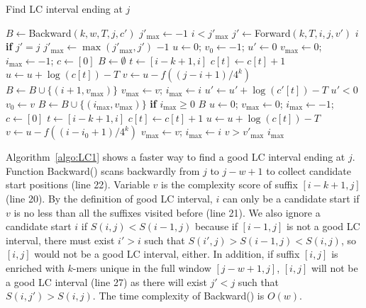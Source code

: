 \documentclass[webpdf,contemporary,large,namedate]{oup-authoring-template}%
\begin{document}
\begin{algorithm}[bt]
	\caption{Find LC interval ending at $j$}\label{algo:LC1}
	\begin{algorithmic}[1]
			\State $B\gets${\sc Backward}$(k,w,T,j,c')$
			\State $j'_{\max}\gets-1$
				 $i<j'_{\max}$
				\State $j'\gets${\sc Forward}$(k,T,i,j,v')$
				\State \Return $i$ {\bf if} $j'=j$
				\State $j'_{\max}\gets\max(j'_{\max},j')$
			\EndFor
			\State \Return $-1$
		\EndProcedure
			\State $u\gets 0$; $v_0\gets-1$; $u'\gets 0$
			\State $v_{\max}\gets0$; $i_{\max}\gets-1$; $c\gets[0]$
			\State $B\gets\emptyset$
				\State $t\gets[i-k+1,i]$
				\State $c[t]\gets c[t]+1$
				\State $u\gets u+\log(c[t])-T$
				\State $v\gets u-f((j-i+1)/4^k)$
					\State $B\gets B\cup\{(i+1,v_{\max})\}$
					\State $v_{\max}\gets v$; $i_{\max}\gets i$
					\State $u'\gets u'+\log(c'[t])-T$
					 $u'<0$
				\EndIf
				\State $v_0\gets v$
			\EndFor
			\State $B\gets B\cup\{(i_{\max},v_{\max})\}$ {\bf if} $i_{\max}\ge0$
			\State\Return $B$
		\EndProcedure
			\State $u\gets 0$; $v_{\max}\gets0$; $i_{\max}\gets-1$; $c\gets[0]$
				\State $t\gets[i-k+1,i]$
				\State $c[t]\gets c[t]+1$
				\State $u\gets u+\log(c[t])-T$
				\State $v\gets u-f((i-i_0+1)/4^k)$
					\State $v_{\max}\gets v$; $i_{\max}\gets i$
				\EndIf
				 $v>v'_{\max}$
			\EndFor
			\State\Return $i_{\max}$
		\EndProcedure
	\end{algorithmic}
\end{algorithm}

Algorithm~\ref{algo:LC1} shows a faster way to find a good LC interval ending at $j$.
Function {\sc Backward}() scans backwardly from $j$ to $j-w+1$ to collect candidate start positions (line 22).
Variable $v$ is the complexity score of suffix $[i-k+1,j]$ (line 20).
By the definition of good LC interval, $i$ can only be a candidate start if $v$ is no less than all the suffixes visited before (line 21).
We also ignore a candidate start $i$ if $S(i,j)<S(i-1,j)$
because if $[i-1,j]$ is not a good LC interval, there must exist $i'>i$ such that $S(i',j)>S(i-1,j)<S(i,j)$, so $[i,j]$ would not be a good LC interval, either.
In addition, if suffix $[i,j]$ is enriched with $k$-mers unique in the full window $[j-w+1,j]$,
$[i,j]$ will not be a good LC interval (line 27) as there will exist $j'<j$ such that $S(i,j')>S(i,j)$.
The time complexity of {\sc Backward}() is $O(w)$.
\end{document}
